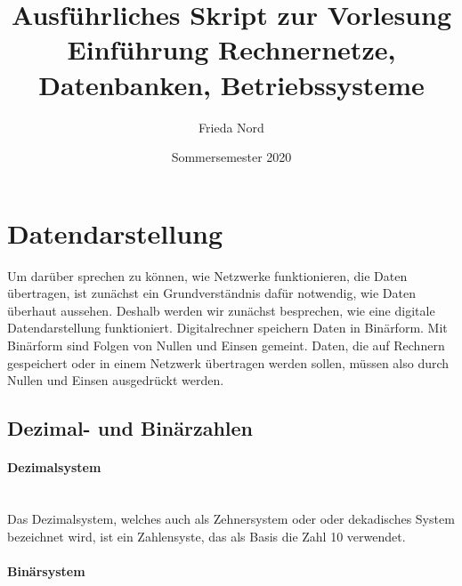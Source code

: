 \documentclass[a4paper,10pt]{article}
\title{Ausführliches Skript zur Vorlesung Einführung Rechnernetze, Datenbanken, Betriebssysteme}
\author{Frieda Nord}
\date{Sommersemester 2020}
\begin{document}
  \maketitle
  \tableofcontents

  \section{Datendarstellung}
  Um darüber sprechen zu können, wie Netzwerke funktionieren, die Daten übertragen,
  ist zunächst ein Grundverständnis dafür notwendig, wie Daten überhaut aussehen.
  Deshalb werden wir zunächst besprechen, wie eine digitale Datendarstellung
  funktioniert. Digitalrechner speichern Daten in Binärform. Mit Binärform sind
  Folgen von Nullen und Einsen gemeint. Daten, die auf Rechnern gespeichert oder
  in einem Netzwerk übertragen werden sollen, müssen also durch Nullen und Einsen
  ausgedrückt werden.

  \subsection{Dezimal- und Binärzahlen}
  \paragraph{Dezimalsystem}\mbox{}\\
  Das Dezimalsystem, welches auch als Zehnersystem oder oder dekadisches System
  bezeichnet wird, ist ein Zahlensyste, das als Basis die Zahl 10 verwendet.

  \paragraph{Binärsystem}\mbox{}\\
\end{document}

